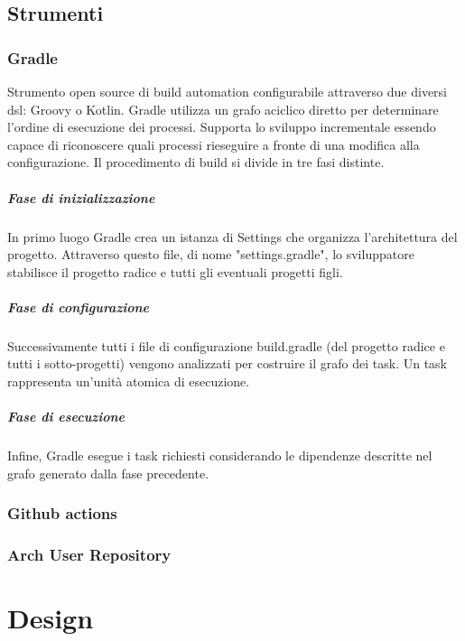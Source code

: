 \documentclass[12pt,a4paper,openright,twoside]{book}
\begin{document}
\section{Strumenti}

\subsection{Gradle}

Strumento open source di build automation configurabile attraverso due diversi \ac{dsl}: Groovy o Kotlin. Gradle utilizza un grafo aciclico diretto per determinare l'ordine di esecuzione dei processi. Supporta lo sviluppo incrementale essendo capace di riconoscere quali processi rieseguire a fronte di una modifica alla configurazione.
Il procedimento di build si divide in tre fasi distinte.
\paragraph{Fase di inizializzazione} In primo luogo Gradle crea un istanza di Settings che organizza l'architettura del progetto. Attraverso questo file, di nome "settings.gradle", lo sviluppatore stabilisce il progetto radice e tutti gli eventuali progetti figli. 
\paragraph{Fase di configurazione} Successivamente tutti i file di configurazione build.gradle (del progetto radice e tutti i sotto-progetti) vengono analizzati per costruire il grafo dei task. Un task rappresenta un'unità atomica di esecuzione.
\paragraph{Fase di esecuzione} Infine, Gradle esegue i task richiesti considerando le dipendenze descritte nel grafo generato dalla fase precedente.

\subsection{Github actions}

\subsection{Arch User Repository}

\chapter{Design}
\end{document}
